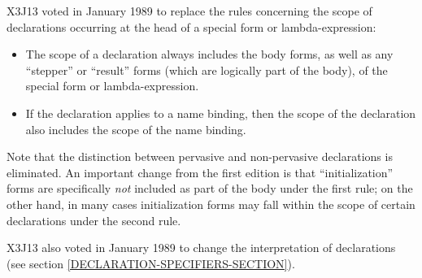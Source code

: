 \begin{defspec}
\begin{new}
X3J13 voted in January 1989
to replace the rules concerning the scope of
declarations occurring at the head of a special form or lambda-expression:
\begin{itemize}
\item The scope of a declaration always includes the body forms, as well as any
``stepper'' or ``result'' forms (which are logically part of the body), of the
special form or lambda-expression.

\item If the declaration applies to a name binding, then the scope of the
declaration also includes the scope of the name binding.
\end{itemize}
Note that
the distinction between pervasive and non-pervasive
declarations is eliminated.  An important change
from the first edition is that ``initialization''
forms are specifically {\it not} included as part of the body under the first
rule; on the other hand, in many cases initialization forms may fall
within the scope of certain declarations under the second rule.
\end{new}

\begin{new}
X3J13 also voted in January 1989
to change the interpretation
of  declarations (see section \ref{DECLARATION-SPECIFIERS-SECTION}).
\end{new}


\end{defspec}
